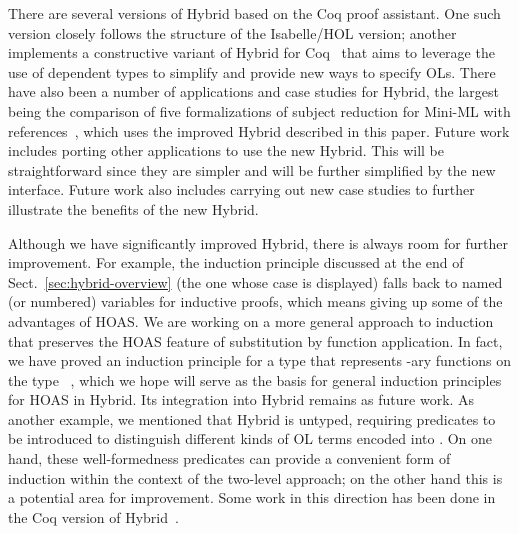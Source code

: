 \documentclass[copyright,creativecommons]{eptcs}
\begin{document}
There are several versions of Hybrid based on the Coq proof assistant.
One such version \cite{felty/momigliano:2008} closely follows the
structure of the Isabelle\slash HOL version; another implements a
constructive variant of Hybrid for Coq~\cite{capretta/felty:2006} that
aims to leverage the use of dependent types to simplify and provide
new ways to specify OLs.  There have also been a number of
applications and case studies for Hybrid, the largest being the
comparison of five formalizations of subject reduction for Mini-ML
with references~\cite{martin:2010a}, which uses
the improved Hybrid described in this paper.  Future work includes
porting other applications to use the new Hybrid.  This will be
straightforward since they are simpler and will be further simplified
by the new interface.  Future work also includes carrying out new
case studies to further illustrate the benefits of the new Hybrid.

Although we have significantly improved Hybrid, there is always room
for further improvement.  For example, the induction principle
discussed at the end of Sect.~\ref{sec:hybrid-overview} (the one whose
 case is displayed) falls back to
named (or numbered) variables for inductive proofs, which means giving
up some of the advantages of HOAS.  We are working on a more general
approach to induction that preserves the HOAS feature of substitution
by function application.  In fact, we have proved an induction
principle for a type that represents -ary functions on the type
~\cite{martin:2010a}, which we hope will serve as the basis
for general induction principles for HOAS in Hybrid.  Its integration
into Hybrid remains as future work.  As another example, we mentioned
that Hybrid is untyped, requiring predicates to be introduced to
distinguish different kinds of OL terms encoded into .  On
one hand, these well-formedness predicates can provide a convenient
form of induction within the context of the two-level approach; on the
other hand this is a potential area for improvement.  Some work in
this direction has been done in the Coq version of
Hybrid~\cite{capretta/felty:2009}.
\end{document}
